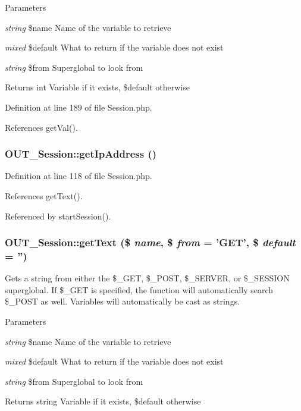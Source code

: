 \begin{DoxyParams}{Parameters}
\item[{\em string}]\$name Name of the variable to retrieve \item[{\em mixed}]\$default What to return if the variable does not exist \item[{\em string}]\$from Superglobal to look from\end{DoxyParams}
\begin{DoxyReturn}{Returns}
int Variable if it exists, \$default otherwise 
\end{DoxyReturn}


Definition at line 189 of file Session.php.

References getVal().\hypertarget{classOUT__Session_a7dc75b2f274e8e8ecc0a43ebb94f8d7b}{
\subsubsection[{getIpAddress}]{\setlength{\rightskip}{0pt plus 5cm}OUT\_\-Session::getIpAddress ()}}
\label{d6/d75/classOUT__Session_a7dc75b2f274e8e8ecc0a43ebb94f8d7b}


Definition at line 118 of file Session.php.

References getText().

Referenced by startSession().\hypertarget{classOUT__Session_a455e243a97243d5585156a47fae04b27}{
\subsubsection[{getText}]{\setlength{\rightskip}{0pt plus 5cm}OUT\_\-Session::getText (\$ {\em name}, \/  \$ {\em from} = {\ttfamily 'GET'}, \/  \$ {\em default} = {\ttfamily ''})}}
\label{d6/d75/classOUT__Session_a455e243a97243d5585156a47fae04b27}
Gets a string from either the \$\_\-GET, \$\_\-POST, \$\_\-SERVER, or \$\_\-SESSION superglobal. If \$\_\-GET is specified, the function will automatically search \$\_\-POST as well. Variables will automatically be cast as strings.


\begin{DoxyParams}{Parameters}
\item[{\em string}]\$name Name of the variable to retrieve \item[{\em mixed}]\$default What to return if the variable does not exist \item[{\em string}]\$from Superglobal to look from\end{DoxyParams}
\begin{DoxyReturn}{Returns}
string Variable if it exists, \$default otherwise 
\end{DoxyReturn}


